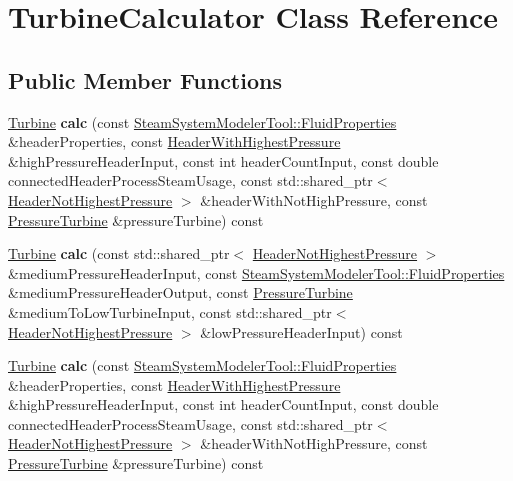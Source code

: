 \hypertarget{class_turbine_calculator}{}\section{Turbine\+Calculator Class Reference}
\label{class_turbine_calculator}
\subsection*{Public Member Functions}
\begin{DoxyCompactItemize}
\item 
\mbox{\label{class_turbine_calculator_a7904fce359c5ec124e13fe76afe6efa2}} 
\hyperlink{class_turbine}{Turbine} {\bfseries calc} (const \hyperlink{struct_steam_system_modeler_tool_1_1_fluid_properties}{Steam\+System\+Modeler\+Tool\+::\+Fluid\+Properties} \&header\+Properties, const \hyperlink{class_header_with_highest_pressure}{Header\+With\+Highest\+Pressure} \&high\+Pressure\+Header\+Input, const int header\+Count\+Input, const double connected\+Header\+Process\+Steam\+Usage, const std\+::shared\+\_\+ptr$<$ \hyperlink{class_header_not_highest_pressure}{Header\+Not\+Highest\+Pressure} $>$ \&header\+With\+Not\+High\+Pressure, const \hyperlink{class_pressure_turbine}{Pressure\+Turbine} \&pressure\+Turbine) const
\item 
\mbox{\label{class_turbine_calculator_a7d5e42c0554f41015104c4837ce2f8fa}} 
\hyperlink{class_turbine}{Turbine} {\bfseries calc} (const std\+::shared\+\_\+ptr$<$ \hyperlink{class_header_not_highest_pressure}{Header\+Not\+Highest\+Pressure} $>$ \&medium\+Pressure\+Header\+Input, const \hyperlink{struct_steam_system_modeler_tool_1_1_fluid_properties}{Steam\+System\+Modeler\+Tool\+::\+Fluid\+Properties} \&medium\+Pressure\+Header\+Output, const \hyperlink{class_pressure_turbine}{Pressure\+Turbine} \&medium\+To\+Low\+Turbine\+Input, const std\+::shared\+\_\+ptr$<$ \hyperlink{class_header_not_highest_pressure}{Header\+Not\+Highest\+Pressure} $>$ \&low\+Pressure\+Header\+Input) const
\item 
\mbox{\label{class_turbine_calculator_a7904fce359c5ec124e13fe76afe6efa2}} 
\hyperlink{class_turbine}{Turbine} {\bfseries calc} (const \hyperlink{struct_steam_system_modeler_tool_1_1_fluid_properties}{Steam\+System\+Modeler\+Tool\+::\+Fluid\+Properties} \&header\+Properties, const \hyperlink{class_header_with_highest_pressure}{Header\+With\+Highest\+Pressure} \&high\+Pressure\+Header\+Input, const int header\+Count\+Input, const double connected\+Header\+Process\+Steam\+Usage, const std\+::shared\+\_\+ptr$<$ \hyperlink{class_header_not_highest_pressure}{Header\+Not\+Highest\+Pressure} $>$ \&header\+With\+Not\+High\+Pressure, const \hyperlink{class_pressure_turbine}{Pressure\+Turbine} \&pressure\+Turbine) const

\end{DoxyCompactItemize}
